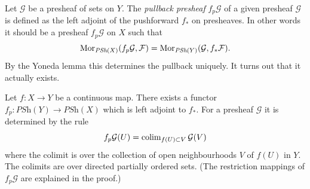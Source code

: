 \noindent
Let $\mathcal{G}$ be a presheaf of sets on $Y$.
The {\it pullback presheaf} $f_p\mathcal{G}$
of a given presheaf $\mathcal{G}$ is defined as the left adjoint
of the pushforward $f_*$ on presheaves. In other words it
should be a presheaf $f_p \mathcal{G}$ on $X$ such that
$$
\mathop{\mathrm{Mor}}\nolimits_{\textit{PSh}(X)}(f_p\mathcal{G}, \mathcal{F})
=
\mathop{\mathrm{Mor}}\nolimits_{\textit{PSh}(Y)}(\mathcal{G}, f_*\mathcal{F}).
$$
By the Yoneda lemma this determines the pullback uniquely.
It turns out that it actually exists.

\begin{lemma}
\label{lemma-pullback-presheaves}
Let $f : X \to Y$ be a continuous map.
There exists a functor
$f_p : \textit{PSh}(Y) \to \textit{PSh}(X)$
which is left adjoint to $f_*$. For a presheaf
$\mathcal{G}$ it is determined by the rule
$$
f_p\mathcal{G}(U) = \mathop{\mathrm{colim}}\nolimits_{f(U) \subset V} \mathcal{G}(V)
$$
where the colimit is over the collection of open neighbourhoods
$V$ of $f(U)$ in $Y$. The colimits are over
directed partially ordered sets.
(The restriction mappings of $f_p\mathcal{G}$ are explained in the proof.)
\end{lemma}

